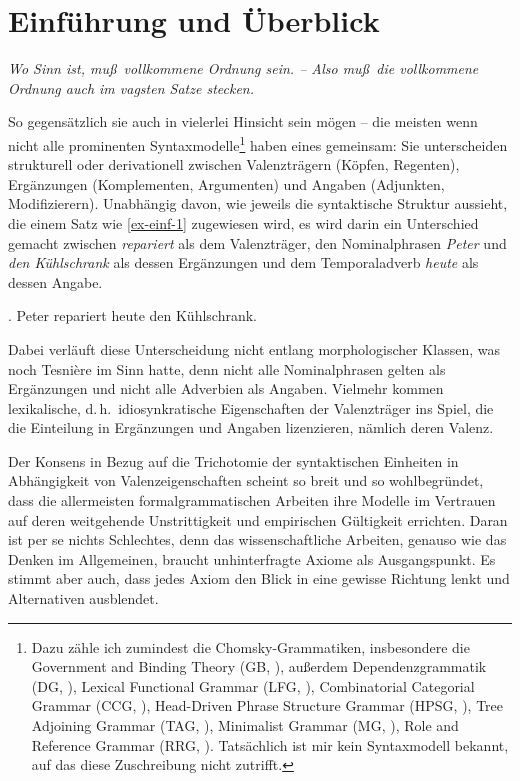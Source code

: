 \chapter{Einführung und Überblick} \label{sec-einfuehrung}


\epigraph{\em Wo Sinn ist, mu\ss \ vollkommene Ordnung sein. -- Also mu\ss \ die vollkommene Ordnung auch im vagsten Satze stecken.\\[-5ex]}{\citet[\S 98]{Wittgenstein:84}}

\noindent So gegensätzlich sie auch in vielerlei Hinsicht sein mögen -- die meisten wenn nicht alle prominenten Syntaxmodelle\footnote{Dazu zähle ich zumindest die Chomsky-Grammatiken, insbesondere die Government and Binding Theory (GB, \citealt{Chomsky:81}), au\ss erdem Dependenzgrammatik (DG, \citealt{Tesniere:59,Kunze:75,Heringer:96}), Lexical Functional Grammar (LFG, \citealt{Kaplan:Bresnan:82}), Combinatorial Categorial Grammar (CCG, \citealt{Steedman:00}), Head-Driven Phrase Structure Grammar (HPSG, \citealt{Pollard:Sag:94}), Tree Adjoining Grammar (TAG, \citealt{Joshi:Schabes:97}), Minimalist Grammar (MG, \citealt{Stabler:97}), Role and Reference Grammar (RRG, \citealt{Valin:05}). Tatsächlich ist mir kein Syntaxmodell bekannt, auf das diese Zuschreibung nicht zutrifft.} haben eines gemeinsam: Sie unterscheiden strukturell oder derivationell zwischen Valenzträgern (Köpfen, Regenten), Ergänzungen (Komplementen, Argumenten) und Angaben (Adjunkten, Modifizierern). Unabhängig davon, wie jeweils die syntaktische Struktur aussieht, die einem Satz wie \ref{ex-einf-1} zugewiesen wird, es wird darin ein Unterschied gemacht zwischen {\it repariert} als dem Valenzträger, den Nominalphrasen {\it Peter} und {\it den Kühlschrank} als dessen Ergänzungen und dem Temporaladverb {\it heute} als dessen Angabe.
  
\ex. \label{ex-einf-1} Peter repariert heute den Kühlschrank.

Dabei verläuft diese Unterscheidung nicht entlang morphologischer Klassen, was noch Tesni\`ere im Sinn hatte, denn nicht alle Nominalphrasen gelten als Ergänzungen und nicht alle Adverbien als Angaben. Vielmehr kommen lexikalische, d.\,h.\ idiosynkratische Eigenschaften der Valenzträger ins Spiel, die die Einteilung in Ergänzungen und Angaben lizenzieren, nämlich deren Valenz.   

Der Konsens in Bezug auf die Trichotomie der syntaktischen Einheiten in Abhängigkeit von Valenzeigenschaften scheint so breit und so wohlbegründet, dass die allermeisten formalgrammatischen Arbeiten ihre Modelle im Vertrauen auf deren weitgehende Unstrittigkeit und empirischen Gültigkeit errichten. Daran ist per se nichts Schlechtes, denn das wissenschaftliche Arbeiten, genauso wie das Denken im Allgemeinen, braucht unhinterfragte Axiome als Ausgangspunkt. Es stimmt aber auch, dass jedes Axiom den Blick in eine gewisse Richtung lenkt und Alternativen ausblendet. 

